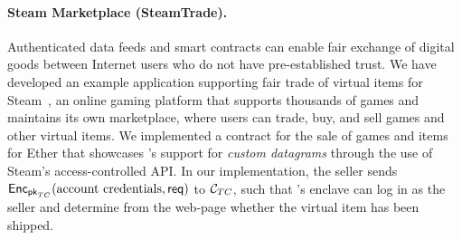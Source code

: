 \paragraph{Steam Marketplace ({\sf SteamTrade}).} 
Authenticated data feeds and smart contracts can enable
fair exchange of digital goods 
between Internet users who do not have pre-established trust.
We have developed an example application supporting
fair trade of virtual items for Steam~\cite{steam},
an online gaming platform that supports thousands of games and maintains its own marketplace, where users can trade, buy, and sell games and other virtual items.  
We implemented a contract for the sale of games and items for Ether that showcases \tc's support for {\it custom datagrams} through the use of Steam's access-controlled API.
In our implementation, 
the seller sends ${\sf Enc}_{{\sf pk}_{TC}}(\text{account credentials}, {\sf req})$
to $\tcont$,
such that \tc's enclave can log in as the seller  
and determine from the web-page whether the virtual item
has been shipped.



\iffalse
